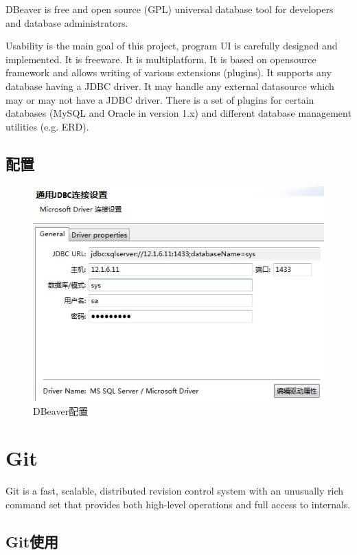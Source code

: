\documentclass[paper=a4,fontsize=11pt]{article}
\begin{document}
	DBeaver is free and open source (GPL) universal database tool for developers and database administrators.
	
	Usability is the main goal of this project, program UI is carefully designed and implemented.
	It is freeware.
	It is multiplatform.
	It is based on opensource framework and allows writing of various extensions (plugins).
	It supports any database having a JDBC driver.
	It may handle any external datasource which may or may not have a JDBC driver.
	There is a set of plugins for certain databases (MySQL and Oracle in version 1.x) and different database management utilities (e.g. ERD).
	
	\subsection{配置}
	
	\begin{figure}[htbp]
		\centering
		\includegraphics[scale=0.8]{JDBCConnectionConfig.jpg}
		\caption{DBeaver配置}
		\label{JDBCConnectionConfig}
	\end{figure}
	
	\section{Git}
	Git is a fast, scalable, distributed revision control system with an unusually rich command set that provides both high-level operations and full access to internals.
	
	\subsection{Git使用}
	
\end{document}
